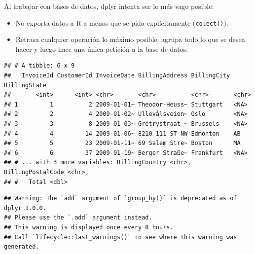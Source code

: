 \documentclass[]{book}
\newenvironment{Shaded}{\begin{snugshade}}{\end{snugshade}}
\newcommand{\StringTok}[1]{\textcolor[rgb]{0.31,0.60,0.02}{#1}}
\newcommand{\CommentTok}[1]{\textcolor[rgb]{0.56,0.35,0.01}{\textit{#1}}}
\newcommand{\OperatorTok}[1]{\textcolor[rgb]{0.81,0.36,0.00}{\textbf{#1}}}
\newcommand{\NormalTok}[1]{#1}
\begin{document}
Al trabajar con bases de datos, dplyr intenta ser lo más vago posible:

\begin{itemize}
\item
  No exporta datos a R a menos que se pida explícitamente
  (\texttt{colect()}).
\item
  Retrasa cualquier operación lo máximo posible: agrupa todo lo que se
  desea hacer y luego hace una única petición a la base de datos.
\end{itemize}

\begin{Shaded}
\end{Shaded}

\begin{verbatim}
## # A tibble: 6 x 9
##   InvoiceId CustomerId InvoiceDate BillingAddress BillingCity BillingState
##       <int>      <int> <chr>       <chr>          <chr>       <chr>       
## 1         1          2 2009-01-01~ Theodor-Heuss~ Stuttgart   <NA>        
## 2         2          4 2009-01-02~ Ullevålsveien~ Oslo        <NA>        
## 3         3          8 2009-01-03~ Grétrystraat ~ Brussels    <NA>        
## 4         4         14 2009-01-06~ 8210 111 ST NW Edmonton    AB          
## 5         5         23 2009-01-11~ 69 Salem Stre~ Boston      MA          
## 6         6         37 2009-01-19~ Berger Straße~ Frankfurt   <NA>        
## # ... with 3 more variables: BillingCountry <chr>, BillingPostalCode <chr>,
## #   Total <dbl>
\end{verbatim}

\begin{Shaded}
\end{Shaded}

\begin{verbatim}
## Warning: The `add` argument of `group_by()` is deprecated as of dplyr 1.0.0.
## Please use the `.add` argument instead.
## This warning is displayed once every 8 hours.
## Call `lifecycle::last_warnings()` to see where this warning was generated.
\end{verbatim}
\end{document}
